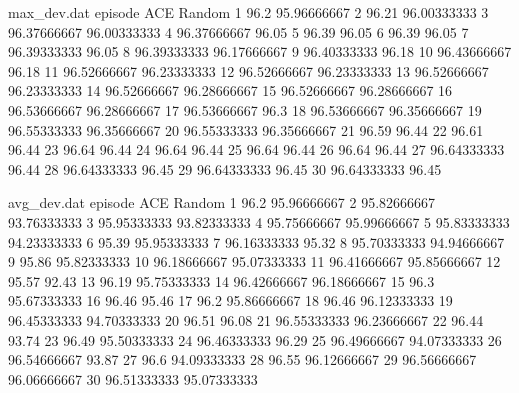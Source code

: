 \documentclass[11pt,a4paper]{article}
\begin{document}
\begin{filecontents}{max_dev.dat}
episode	ACE	Random
1	96.2	95.96666667
2	96.21	96.00333333
3	96.37666667	96.00333333
4	96.37666667	96.05
5	96.39	96.05
6	96.39	96.05
7	96.39333333	96.05
8	96.39333333	96.17666667
9	96.40333333	96.18
10	96.43666667	96.18
11	96.52666667	96.23333333
12	96.52666667	96.23333333
13	96.52666667	96.23333333
14	96.52666667	96.28666667
15	96.52666667	96.28666667
16	96.53666667	96.28666667
17	96.53666667	96.3
18	96.53666667	96.35666667
19	96.55333333	96.35666667
20	96.55333333	96.35666667
21	96.59	96.44
22	96.61	96.44
23	96.64	96.44
24	96.64	96.44
25	96.64	96.44
26	96.64	96.44
27	96.64333333	96.44
28	96.64333333	96.45
29	96.64333333	96.45
30	96.64333333	96.45
\end{filecontents}

\begin{filecontents}{avg_dev.dat}
episode	ACE	Random
1	96.2	95.96666667
2	95.82666667	93.76333333
3	95.95333333	93.82333333
4	95.75666667	95.99666667
5	95.83333333	94.23333333
6	95.39	95.95333333
7	96.16333333	95.32
8	95.70333333	94.94666667
9	95.86	95.82333333
10	96.18666667	95.07333333
11	96.41666667	95.85666667
12	95.57	92.43
13	96.19	95.75333333
14	96.42666667	96.18666667
15	96.3	95.67333333
16	96.46	95.46
17	96.2	95.86666667
18	96.46	96.12333333
19	96.45333333	94.70333333
20	96.51	96.08
21	96.55333333	96.23666667
22	96.44	93.74
23	96.49	95.50333333
24	96.46333333	96.29
25	96.49666667	94.07333333
26	96.54666667	93.87
27	96.6	94.09333333
28	96.55	96.12666667
29	96.56666667	96.06666667
30	96.51333333	95.07333333
\end{filecontents}
\end{document}
